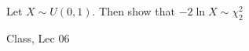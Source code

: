 \begin{samepage}
\begin{ex}
Let $X \sim U(0,1)$. Then show that $-2 \ln X \sim \chi^2_2$
\end{ex}
\begin{source}
Class, Lec 06
\end{source}
\end{samepage}
